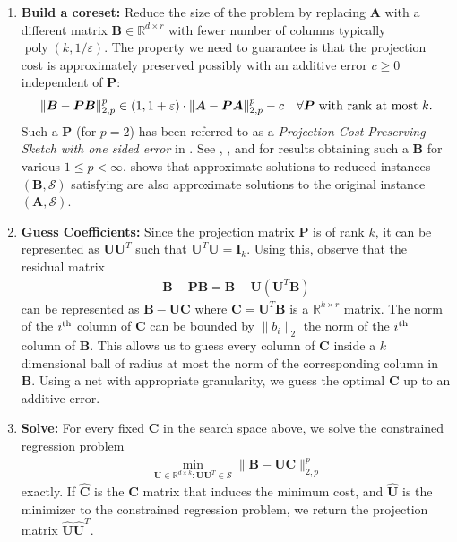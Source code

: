 \documentclass[11pt]{article}
\theoremstyle{plain}
\theoremstyle{plain}
\theoremstyle{definition}
\theoremstyle{plain}
\theoremstyle{remark}
\newcommand{\RR}{\mathbb{R}}
\newcommand{\cS}{\mathcal{S}}
\newcommand{\poly}{\operatorname{poly}}
\begin{document}
\begin{enumerate}
    \item \textbf{Build a coreset:} Reduce the size of the problem by replacing $\bm{A}$ with a different matrix $\bm{B}\in \RR^{d\times r}$ with fewer number of columns typically $\poly(k,1/\varepsilon)$. The property we need to guarantee is that the projection cost is approximately preserved possibly with an additive error $c\geq 0$ independent of $\bm{P}$:
    \begin{align}
    \label{eqn:approximate_cost}    \|\bm{B}-\bm{P}\bm{B}\|_{2,p}^p \in (1,1+\varepsilon)\cdot   \|\bm{A}-\bm{P}\bm{A}\|_{2,p}^p-c \quad \forall \bm{P} \textnormal{ with rank at most } k.
    \end{align}
Such a $\bm{P}$ (for $p=2$) has been referred to as a \emph{Projection-Cost-Preserving Sketch with one sided error} in \cite{cohen2015dimensionality} . See , , and  for results obtaining such a $\bm{B}$ for various $1\leq p<\infty$.  shows that approximate solutions to reduced instances $(\bm{B}, \cS)$ satisfying  are also approximate solutions to the original instance $(\bm{A}, \cS)$.
\item \textbf{Guess Coefficients:} Since the projection matrix $\bm{P}$ is of rank $k$, it can be represented as $\bm{U}\bm{U}^T$ such that $\bm{U}^T\bm{U}=\bm{I}_k$. Using this, observe that the residual matrix 
    \begin{align*}
    \bm{B}-\bm{P}\bm{B} = \bm{B}-\bm{U}(\bm{U}^T\bm{B})
    \end{align*}
     can be represented as $\bm{B}-\bm{U}\bm{C}$ where $\bm{C}=\bm{U}^T\bm{B}$ is a $\RR^{k\times r}$ matrix. The norm of the $i^{\textnormal{th}}$ column of $\bm{C}$ can be bounded by $\|b_i\|_2$ the norm of the $i^{\textnormal{th}}$ column of $\bm{B}$. This allows us to guess every column of $\bm{C}$ inside a $k$ dimensional ball of radius at most the norm of the corresponding column in $\bm{B}$. Using a net with appropriate granularity, we guess the optimal $\bm{C}$ up to an additive error. 
    \item \textbf{Solve:} For every fixed $\bm{C}$ in the search space above,  we solve the constrained regression problem 
    \begin{align*}
        \min\limits_{\bm{U}\in \RR^{d\times k}: \bm{U}\bm{U}^T\in \cS}\|\bm{B}-\bm{U}\bm{C}\|_{2,p}^p
    \end{align*}
    exactly. If $\widehat{\bm{C}}$ is the $\bm{C}$ matrix that induces the minimum cost, and $\widehat{\bm{U}}$ is the minimizer to the constrained regression problem, we return the projection matrix $\widehat{\bm{U}}\widehat{\bm{U}}^T$. 
\end{enumerate}
\end{document}
